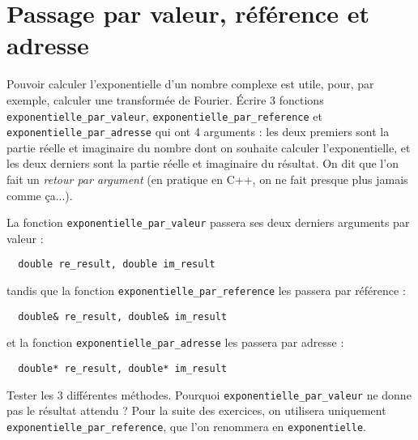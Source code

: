 \documentclass{book}
\newcommand{\inline}[1]{\texttt{#1}}
\begin{document}
\section{Passage par valeur, référence et adresse} \label{ex:exp}

Pouvoir calculer l'exponentielle d'un nombre complexe est utile, pour, par exemple, calculer une transformée de Fourier. Écrire 3 fonctions \inline{exponentielle_par_valeur}, \inline{exponentielle_par_reference} et \inline{exponentielle_par_adresse} qui ont 4 arguments : les deux premiers sont la partie réelle et imaginaire du nombre dont on souhaite calculer l'exponentielle, et les deux derniers sont la partie réelle et imaginaire du résultat. On dit que l'on fait un \textit{retour par argument} (en pratique en C++, on ne fait presque plus jamais comme ça...).

La fonction \inline{exponentielle_par_valeur} passera ses deux derniers arguments par valeur :
\begin{verbatim}
  double re_result, double im_result
\end{verbatim}
tandis que la fonction \inline{exponentielle_par_reference} les passera par référence :
\begin{verbatim}
  double& re_result, double& im_result
\end{verbatim}
et la fonction \inline{exponentielle_par_adresse} les passera par adresse :
\begin{verbatim}
  double* re_result, double* im_result
\end{verbatim}
Tester les 3 différentes méthodes. Pourquoi \inline{exponentielle_par_valeur} ne donne pas le résultat attendu ? Pour la suite des exercices, on utilisera uniquement \inline{exponentielle_par_reference}, que l'on renommera en \inline{exponentielle}.
\end{document}
